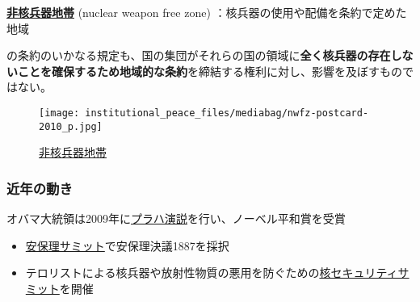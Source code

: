 \documentclass[
  xelatex,
  ja=standard]{bxjsarticle}
\providecommand{\tightlist}{%
  \setlength{\itemsep}{0pt}\setlength{\parskip}{0pt}}\usepackage{longtable,booktabs,array}
\begin{document}
\href{https://www.un.org/disarmament/wmd/nuclear/nwfz/}{\textbf{非核兵器地帯}}
(nuclear weapon free zone) ：核兵器の使用や配備を条約で定めた地域

\begin{tcolorbox}[enhanced jigsaw, left=2mm, toprule=.15mm, opacityback=0, colframe=quarto-callout-note-color-frame, opacitybacktitle=0.6, breakable, coltitle=black, colbacktitle=quarto-callout-note-color!10!white, colback=white, bottomtitle=1mm, toptitle=1mm, titlerule=0mm, title=\textcolor{quarto-callout-note-color}{\faInfo}\hspace{0.5em}{\href{https://www1.doshisha.ac.jp/~karai/intlaw/docs/npt.htm}{核兵器不拡散条約}　第7条}, arc=.35mm, rightrule=.15mm, bottomrule=.15mm, leftrule=.75mm]

の条約のいかなる規定も、国の集団がそれらの国の領域に\textbf{全く核兵器の存在しないことを確保するため地域的な条約}を締結する権利に対し、影響を及ぼすものではない。

\end{tcolorbox}

\begin{figure}[htpb]

{\centering \texttt{[image: institutional\_peace\_files/mediabag/nwfz-postcard-2010\_p.jpg]}

}

\caption{\href{https://www.un.org/nwfz/content/overview-nuclear-weapon-free-zones}{非核兵器地帯}}

\end{figure}

\hypertarget{ux8fd1ux5e74ux306eux52d5ux304d}{%
\subsubsection{近年の動き}\label{ux8fd1ux5e74ux306eux52d5ux304d}}

オバマ大統領は2009年に\href{https://ja.wikisource.org/wiki/\%E3\%83\%90\%E3\%83\%A9\%E3\%82\%AF\%E3\%83\%BB\%E3\%82\%AA\%E3\%83\%90\%E3\%83\%9E\%E3\%81\%AE\%E3\%83\%97\%E3\%83\%A9\%E3\%83\%8F\%E3\%81\%A7\%E3\%81\%AE\%E6\%BC\%94\%E8\%AA\%AC}{プラハ演説}を行い、ノーベル平和賞を受賞

\begin{itemize}
\tightlist
\item
  \href{https://www.mofa.go.jp/mofaj/gaiko/un_cd/gun_un/anpori_k09_gh.html}{安保理サミット}で安保理決議1887を採択
\item
  テロリストによる核兵器や放射性物質の悪用を防ぐための\href{https://www.mofa.go.jp/mofaj/gaiko/kaku_secu/index.html}{核セキュリティサミット}を開催
\end{itemize}
\end{document}
